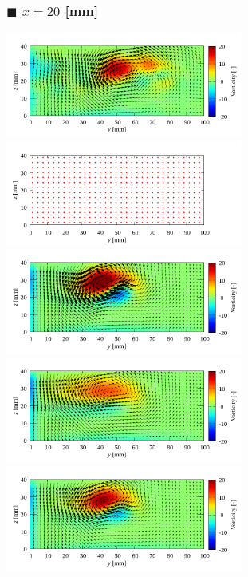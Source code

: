 \documentclass[twocolumn,a4j]{jsarticle}
\begin{document}
\newpage
\begin{figure}[htbp]
	\subsubsection*{$\blacksquare$ $x=20$ [mm]}
	\centering
	{
		\includegraphics[keepaspectratio, width=78mm]{../images/Simulation/Compare/experiment_x=20.png}
		\includegraphics[keepaspectratio, width=78mm]{../images/Simulation/0_Mesh/x=20.png}
		\includegraphics[keepaspectratio, width=78mm]{../images/Simulation/1_Laminar/x=20.png}
		\includegraphics[keepaspectratio, width=78mm]{../images/Simulation/2_kEpsilon/x=20.png}
		\includegraphics[keepaspectratio, width=78mm]{../images/Simulation/3_kOmegaSST/x=20.png}
}
\end{figure}
\end{document}
